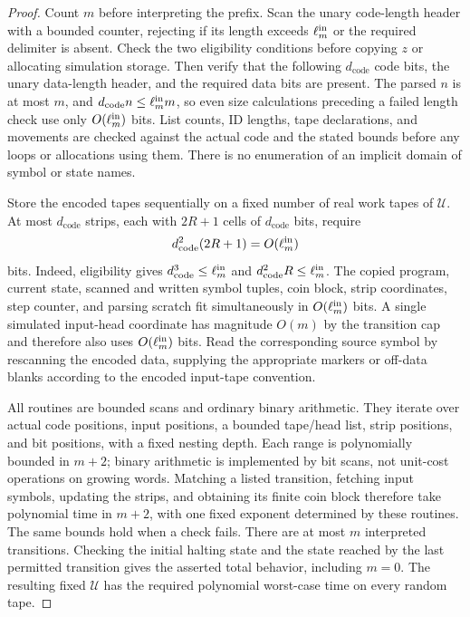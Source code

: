\begin{proof}
Count $m$ before interpreting the prefix.  Scan the unary code-length
header with a bounded counter, rejecting if its length exceeds
$\ell_m^{\rm in}$ or the required delimiter is absent.  Check the two
eligibility conditions before copying $z$ or allocating simulation
storage.  Then verify that the following $d_{\mathrm{code}}$ code bits,
the unary data-length header, and the required data bits are present.
The parsed $n$ is at most $m$, and
$d_{\mathrm{code}}n\le\ell_m^{\rm in} m$, so even size calculations preceding
a failed length check use only $O(\ell_m^{\rm in})$ bits.  List counts, ID
lengths, tape declarations, and movements are checked against the actual
code and the stated bounds before any loops or allocations using them.
There is no enumeration of an implicit domain of symbol or state names.

Store the encoded tapes sequentially on a fixed number of real work
tapes of ${\mathcal U}$.  At most $d_{\mathrm{code}}$ strips, each with $2R+1$
cells of $d_{\mathrm{code}}$ bits, require
\begin{equation}\label{eq:compiler-interpreter-space}
 d_{\mathrm{code}}^2(2R+1)=O(\ell_m^{\rm in})
\end{equation}
bits.  Indeed, eligibility gives
$d_{\mathrm{code}}^3\le\ell_m^{\rm in}$ and
$d_{\mathrm{code}}^2R\le\ell_m^{\rm in}$.
The copied program, current state, scanned and written symbol tuples,
coin block, strip coordinates, step counter, and parsing scratch fit
simultaneously in $O(\ell_m^{\rm in})$ bits.  A single simulated input-head
coordinate has magnitude $O(m)$ by the transition cap and therefore
also uses $O(\ell_m^{\rm in})$ bits.  Read the corresponding source symbol
by rescanning the encoded data, supplying the appropriate markers or
off-data blanks according to the encoded input-tape convention.

All routines are bounded scans and ordinary binary arithmetic.  They
iterate over actual code positions, input positions, a bounded tape/head
list, strip positions, and bit positions, with a fixed nesting depth.
Each range is polynomially bounded in $m+2$; binary arithmetic is
implemented by bit scans, not unit-cost operations on growing words.
Matching a listed transition, fetching input symbols, updating the
strips, and obtaining its finite coin block therefore take polynomial
time in $m+2$, with one fixed exponent determined by these routines.
The same bounds hold when a check fails.  There are at most $m$
interpreted transitions.  Checking the initial halting state and the
state reached by the last permitted transition gives the asserted
total behavior, including $m=0$.  The resulting fixed ${\mathcal U}$ has the
required polynomial worst-case time on every random tape.
\end{proof}

